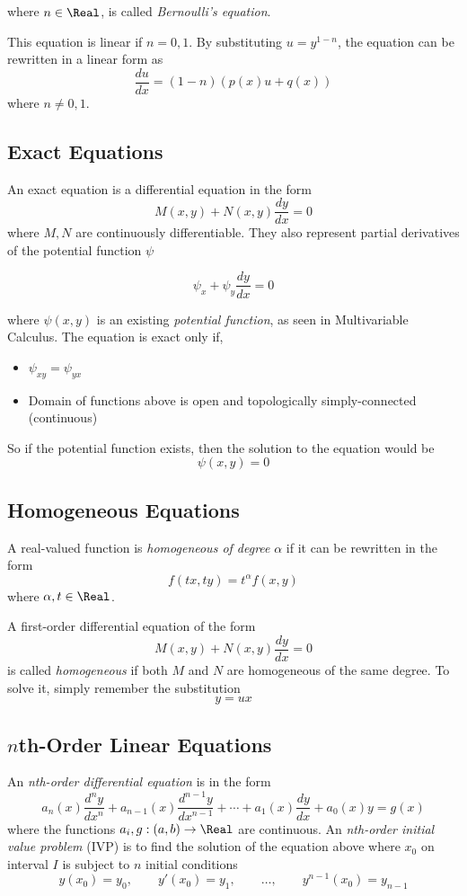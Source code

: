 where $n \in \Real$, is called \textit{Bernoulli's equation}.

This equation is linear if $n = 0, 1$. By substituting $u = y^{1-n}$, the equation can be rewritten in a linear form as
\[
    \frac{du}{dx} = (1 - n)(p(x)u + q(x))
\]
where $n \ne 0,1$.

\subsection{Exact Equations}

An exact equation is a differential equation in the form
\[
    M(x, y) + N(x, y)\frac{dy}{dx} = 0
\]
where $M, N$ are continuously differentiable. They also represent partial derivatives of the potential function $\psi$

\[
    \psi_x + \psi_y\frac{dy}{dx} = 0
\]

where $\psi(x, y)$ is an existing \textit{potential function}, as seen in Multivariable Calculus. The equation is exact only if,
\begin{itemize}
    \item $\psi_{xy} = \psi_{yx}$
    \item Domain of functions above is open and topologically simply-connected (continuous)
\end{itemize}

So if the potential function exists, then the solution to the equation would be
\[
    \psi(x, y) = 0
\]

\subsection{Homogeneous Equations}

A real-valued function is \textit{homogeneous of degree} $\alpha$ if it can be rewritten in the form
\[
    f(tx, ty) = t^{\alpha}f(x, y)
\]
where $\alpha, t \in \Real$.

A first-order differential equation of the form
\[
    M(x, y) + N(x, y)\frac{dy}{dx} = 0
\]
is called \textit{homogeneous} if both $M$ and $N$ are homogeneous of the same degree. To solve it, simply remember the substitution
\[
    y = ux
\]

\subsection{$n$th-Order Linear Equations}

An \textit{nth-order differential equation} is in the form
\[
    a_n(x)\frac{d^n y}{dx^n} + a_{n-1}(x)\frac{d^{n-1} y}{dx^{n-1}} + \cdots + a_1(x)\frac{dy}{dx} + a_0(x)y = g(x)
\]
where the functions $a_i, g: (a, b) \to \Real$ are continuous.
An \textit{nth-order initial value problem} (IVP) is to find the solution of the equation above where $x_0$ on interval $I$ is subject to $n$ initial conditions
\[
    y(x_0) = y_0,\qquad y'(x_0) = y_1,\qquad \ldots,\qquad y^{n-1}(x_0) = y_{n-1}
\]


